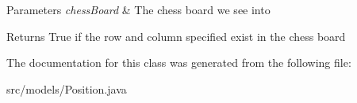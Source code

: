 \begin{DoxyParams}{Parameters}
{\em chess\+Board} & The chess board we see into \\
\hline
\end{DoxyParams}
\begin{DoxyReturn}{Returns}
True if the row and column specified exist in the chess board 
\end{DoxyReturn}


The documentation for this class was generated from the following file\+:\begin{DoxyCompactItemize}
\item 
src/models/Position.\+java\end{DoxyCompactItemize}
